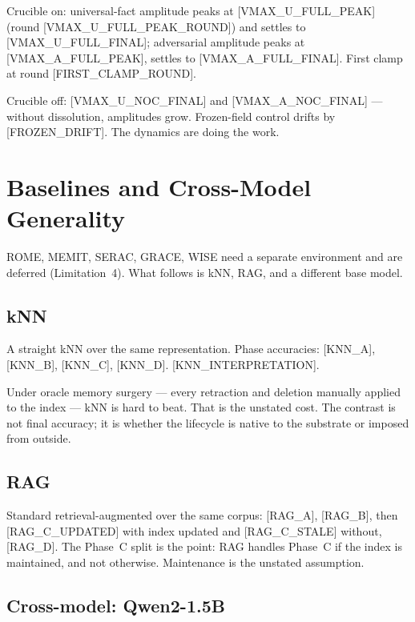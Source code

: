 \documentclass[11pt,twocolumn]{article}
\newcommand{\PH}[1]{[\textsc{#1}]}
\theoremstyle{plain}
\begin{document}
Crucible on: universal-fact amplitude peaks at \PH{VMAX\_U\_FULL\_PEAK} (round \PH{VMAX\_U\_FULL\_PEAK\_ROUND}) and settles to \PH{VMAX\_U\_FULL\_FINAL}; adversarial amplitude peaks at \PH{VMAX\_A\_FULL\_PEAK}, settles to \PH{VMAX\_A\_FULL\_FINAL}. First clamp at round \PH{FIRST\_CLAMP\_ROUND}.

Crucible off: \PH{VMAX\_U\_NOC\_FINAL} and \PH{VMAX\_A\_NOC\_FINAL} --- without dissolution, amplitudes grow. Frozen-field control drifts by \PH{FROZEN\_DRIFT}. The dynamics are doing the work.

\section{Baselines and Cross-Model Generality}
\label{sec:comparisons}

ROME, MEMIT, SERAC, GRACE, WISE need a separate environment and are deferred (Limitation~4). What follows is kNN, RAG, and a different base model.

\subsection{kNN}

A straight kNN over the same representation. Phase accuracies: \PH{KNN\_A}, \PH{KNN\_B}, \PH{KNN\_C}, \PH{KNN\_D}. \PH{KNN\_INTERPRETATION}.

Under oracle memory surgery --- every retraction and deletion manually applied to the index --- kNN is hard to beat. That is the unstated cost. The contrast is not final accuracy; it is whether the lifecycle is native to the substrate or imposed from outside.

\subsection{RAG}

Standard retrieval-augmented over the same corpus: \PH{RAG\_A}, \PH{RAG\_B}, then \PH{RAG\_C\_UPDATED} with index updated and \PH{RAG\_C\_STALE} without, \PH{RAG\_D}. The Phase~C split is the point: RAG handles Phase~C if the index is maintained, and not otherwise. Maintenance is the unstated assumption.

\subsection{Cross-model: Qwen2-1.5B}
\end{document}
